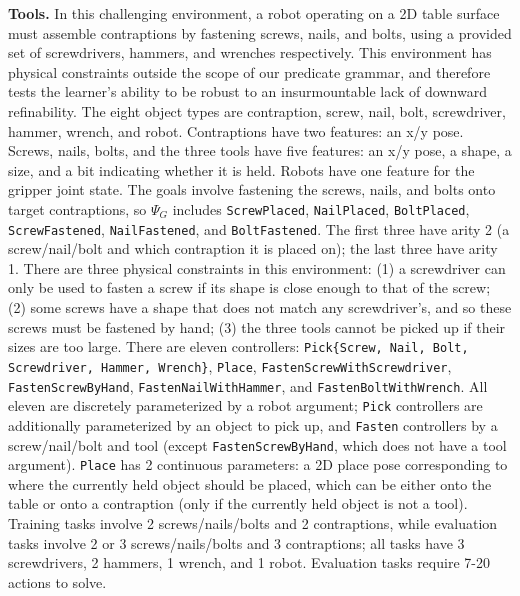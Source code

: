 \begin{tightlist}
    \item \textbf{Tools.} In this challenging environment, a robot operating on a 2D table surface must assemble contraptions by fastening screws, nails, and bolts, using a provided set of screwdrivers, hammers, and wrenches respectively. This environment has physical constraints outside the scope of our predicate grammar, and therefore tests the learner's ability to be robust to an insurmountable lack of downward refinability. The eight object types are contraption, screw, nail, bolt, screwdriver, hammer, wrench, and robot. Contraptions have two features: an x/y pose. Screws, nails, bolts, and the three tools have five features: an x/y pose, a shape, a size, and a bit indicating whether it is held. Robots have one feature for the gripper joint state. The goals involve fastening the screws, nails, and bolts onto target contraptions, so $\Psi_G$ includes \texttt{ScrewPlaced}, \texttt{NailPlaced}, \texttt{BoltPlaced}, \texttt{ScrewFastened}, \texttt{NailFastened}, and \texttt{BoltFastened}. The first three have arity 2 (a screw/nail/bolt and which contraption it is placed on); the last three have arity 1. There are three physical constraints in this environment: (1) a screwdriver can only be used to fasten a screw if its shape is close enough to that of the screw; (2) some screws have a shape that does not match any screwdriver's, and so these screws must be fastened by hand; (3) the three tools cannot be picked up if their sizes are too large. There are eleven controllers: \texttt{Pick\{Screw, Nail, Bolt, Screwdriver, Hammer, Wrench\}}, \texttt{Place}, \texttt{FastenScrewWithScrewdriver}, \texttt{FastenScrewByHand}, \texttt{FastenNailWithHammer}, and \texttt{FastenBoltWithWrench}. All eleven are discretely parameterized by a robot argument; \texttt{Pick} controllers are additionally parameterized by an object to pick up, and \texttt{Fasten} controllers by a screw/nail/bolt and tool (except \texttt{FastenScrewByHand}, which does not have a tool argument). \texttt{Place} has 2 continuous parameters: a 2D place pose corresponding to where the currently held object should be placed, which can be either onto the table or onto a contraption (only if the currently held object is not a tool). Training tasks involve 2 screws/nails/bolts and 2 contraptions, while evaluation tasks involve 2 or 3 screws/nails/bolts and 3 contraptions; all tasks have 3 screwdrivers, 2 hammers, 1 wrench, and 1 robot. Evaluation tasks require 7-20 actions to solve.
\end{tightlist}


